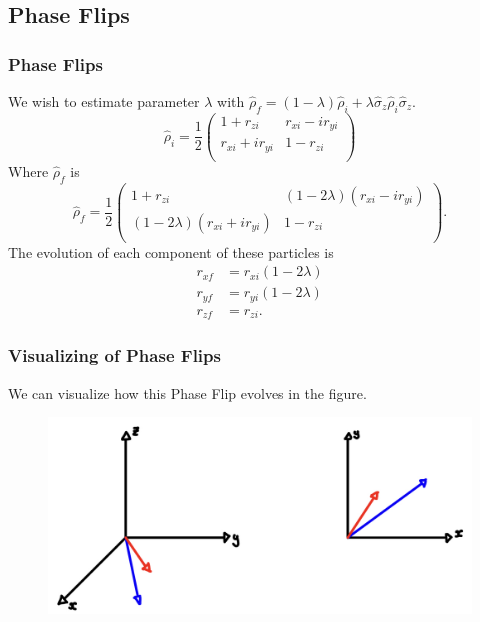 \documentclass{beamer}
\begin{document}
\subsection{\tiny{Phase Flips}}
\begin{frame}
\frametitle{Phase Flips}
We wish to estimate parameter $\lambda$ with $\hat{\rho}_f=(1-\lambda)\hat{\rho}_i+\lambda\hat{\sigma}_z\hat{\rho}_i\hat{\sigma}_z$.
\begin{equation}\label{eq:35}
\hat{\rho}_i=\frac{1}{2}
\begin{pmatrix}
1+r_{zi} & r_{xi}-ir_{yi} \\
r_{xi}+ir_{yi} & 1-r_{zi} \\
\end{pmatrix}
\end{equation}
Where $\hat{\rho}_f$ is
\begin{equation}\label{eq:36}
\hat{\rho}_f=\frac{1}{2}
\begin{pmatrix}
1+r_{zi} & (1-2\lambda)(r_{xi}-ir_{yi}) \\
(1-2\lambda)(r_{xi}+ir_{yi}) & 1-r_{zi} \\
\end{pmatrix}.
\end{equation}
The evolution of each component of these particles is
\begin{align}\label{eq:37}
r_{xf}&=r_{xi}(1-2\lambda) \nonumber \\
r_{yf}&=r_{yi}(1-2\lambda) \\
r_{zf}&=r_{zi}. \nonumber
\end{align}
\end{frame}
\begin{frame}
\frametitle{Visualizing of Phase Flips}
We can visualize how this Phase Flip evolves in the figure.
\begin{figure}
\begin{center}
\includegraphics[width=0.90\linewidth]{Modeling-Of-Phase-Flip.jpeg}
\end{center}
\end{figure}
\end{frame}
\end{document}
